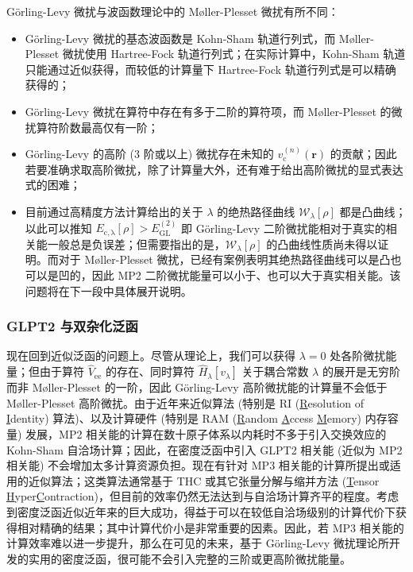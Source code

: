 G\"orling-Levy 微扰与波函数理论中的 M\o{}ller-Plesset 微扰有所不同：
\begin{itemize}[nosep]
  \item G\"orling-Levy 微扰的基态波函数是 Kohn-Sham 轨道行列式，而 M\o{}ller-Plesset 微扰使用 Hartree-Fock 轨道行列式；在实际计算中，Kohn-Sham 轨道只能通过近似获得，而较低的计算量下 Hartree-Fock 轨道行列式是可以精确获得的；
  \item G\"orling-Levy 微扰在算符中存在有多于二阶的算符项，而 M\o{}ller-Plesset 的微扰算符阶数最高仅有一阶；
  \item G\"orling-Levy 的高阶 (3 阶或以上) 微扰存在未知的 $v_\mathrm{c}^{(n)} (\bm{r})$ 的贡献；因此若要准确求取高阶微扰，除了计算量大外，还有难于给出高阶微扰的显式表达式的困难；
  \item 目前通过高精度方法计算给出的关于 $\lambda$ 的绝热路径曲线 $\mathcal{W}_{\lambda} [\rho]$ 都是凸曲线\cite{Teale-Helgaker.JCP.2009,Teale-Helgaker.JCP.2010}；以此可以推知 $E_\mathrm{c, \lambda} [\rho] > E_\mathrm{GL}^{(2)}$ 即 G\"orling-Levy 二阶微扰能相对于真实的相关能一般总是负误差\cite{Seidl-Gori-Giorgi.JCP.2018}；但需要指出的是，$\mathcal{W}_{\lambda} [\rho]$ 的凸曲线性质尚未得以证明\cite{Crisostomo-Burke.LMP.2023}。而对于 M\o{}ller-Plesset 微扰，已经有案例表明其绝热路径曲线可以是凸也可以是凹的\cite{Seidl-Gori-Giorgi.JCP.2018}，因此 MP2 二阶微扰能量可以小于、也可以大于真实相关能。该问题将在下一段中具体展开说明。
\end{itemize}

\subsubsection{GLPT2 与双杂化泛函}

现在回到近似泛函的问题上。尽管从理论上，我们可以获得 $\lambda=0$ 处各阶微扰能量；但由于算符 $\hat V_\mathrm{ee}$ 的存在、同时算符 $\hat H_\lambda [v_\lambda]$ 关于耦合常数 $\lambda$ 的展开是无穷阶而非 M\o{}ller-Plesset 的一阶，因此 G\"orling-Levy 高阶微扰能的计算量不会低于 M\o{}ller-Plesset 高阶微扰。由于近年来近似算法 (特别是 RI (\underline{R}esolution of \underline{I}dentity) 算法)、以及计算硬件 (特别是 RAM (\underline{R}andom \underline{A}ccess \underline{M}emory) 内存容量) 发展，MP2 相关能的计算在数十原子体系以内耗时不多于引入交换效应的 Kohn-Sham 自洽场计算；因此，在密度泛函中引入 GLPT2 相关能 (近似为 MP2 相关能) 不会增加太多计算资源负担。现在有针对 MP3 相关能的计算所提出或适用的近似算法；这类算法通常基于 THC 或其它张量分解与缩并方法 (\underline{T}ensor \underline{H}yper\underline{C}ontraction)\cite{Hohenstein-Martinez.JCP.2012, Parrish-Sherrill.JCP.2012, Lee-Head-Gordon.JCTC.2020, Matthews-Matthews.JCTC.2020}，但目前的效率仍然无法达到与自洽场计算齐平的程度\cite{Matthews-Matthews.JCP.2021}。考虑到密度泛函近似近年来的巨大成功，得益于可以在较低自洽场级别的计算代价下获得相对精确的结果；其中计算代价小是非常重要的因素。因此，若 MP3 相关能的计算效率难以进一步提升，那么在可见的未来，基于 G\"orling-Levy 微扰理论所开发的实用的密度泛函，很可能不会引入\textsf{完整的}三阶或更高阶微扰能量。

